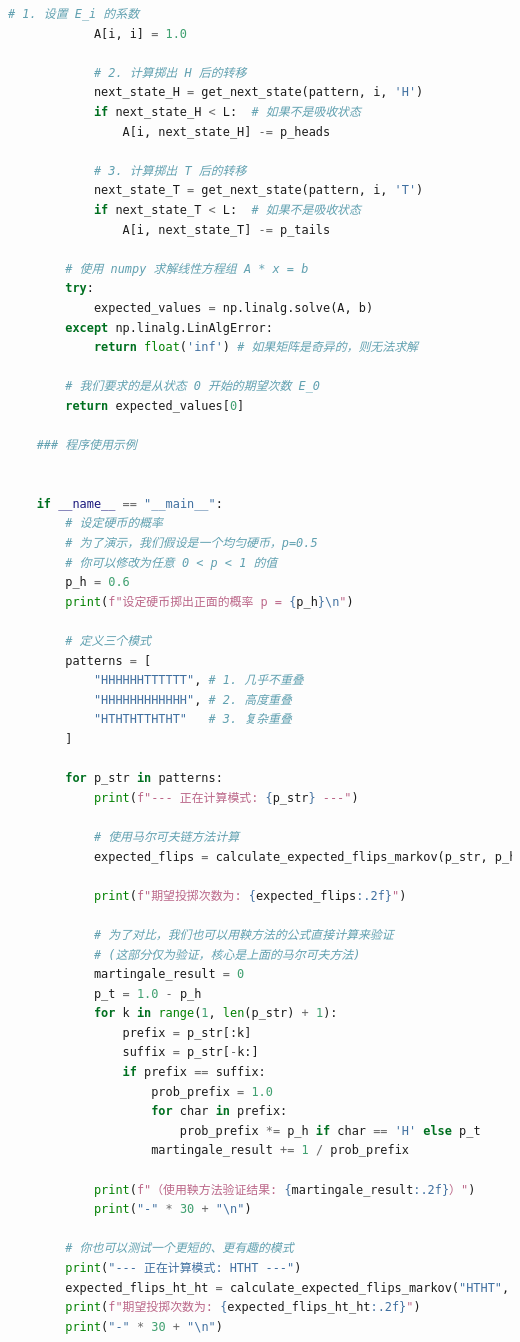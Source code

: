 \documentclass[UTF8]{ctexart}
\begin{document}
\begin{lstlisting}[language=Python, caption={求解期望投掷次数的函数核心逻辑}]
            # 1. 设置 E_i 的系数
            A[i, i] = 1.0
    
            # 2. 计算掷出 H 后的转移
            next_state_H = get_next_state(pattern, i, 'H')
            if next_state_H < L:  # 如果不是吸收状态
                A[i, next_state_H] -= p_heads
    
            # 3. 计算掷出 T 后的转移
            next_state_T = get_next_state(pattern, i, 'T')
            if next_state_T < L:  # 如果不是吸收状态
                A[i, next_state_T] -= p_tails
                
        # 使用 numpy 求解线性方程组 A * x = b
        try:
            expected_values = np.linalg.solve(A, b)
        except np.linalg.LinAlgError:
            return float('inf') # 如果矩阵是奇异的，则无法求解
    
        # 我们要求的是从状态 0 开始的期望次数 E_0
        return expected_values[0]
    
    ### 程序使用示例
    
    
    if __name__ == "__main__":
        # 设定硬币的概率
        # 为了演示，我们假设是一个均匀硬币，p=0.5
        # 你可以修改为任意 0 < p < 1 的值
        p_h = 0.6
        print(f"设定硬币掷出正面的概率 p = {p_h}\n")
    
        # 定义三个模式
        patterns = [
            "HHHHHHTTTTTT", # 1. 几乎不重叠
            "HHHHHHHHHHHH", # 2. 高度重叠
            "HTHTHTTHTHT"   # 3. 复杂重叠
        ]
    
        for p_str in patterns:
            print(f"--- 正在计算模式: {p_str} ---")
            
            # 使用马尔可夫链方法计算
            expected_flips = calculate_expected_flips_markov(p_str, p_h)
            
            print(f"期望投掷次数为: {expected_flips:.2f}")
            
            # 为了对比，我们也可以用鞅方法的公式直接计算来验证
            # (这部分仅为验证，核心是上面的马尔可夫方法)
            martingale_result = 0
            p_t = 1.0 - p_h
            for k in range(1, len(p_str) + 1):
                prefix = p_str[:k]
                suffix = p_str[-k:]
                if prefix == suffix:
                    prob_prefix = 1.0
                    for char in prefix:
                        prob_prefix *= p_h if char == 'H' else p_t
                    martingale_result += 1 / prob_prefix
            
            print(f"（使用鞅方法验证结果: {martingale_result:.2f}）")
            print("-" * 30 + "\n")
    
        # 你也可以测试一个更短的、更有趣的模式
        print("--- 正在计算模式: HTHT ---")
        expected_flips_ht_ht = calculate_expected_flips_markov("HTHT", 0.5)
        print(f"期望投掷次数为: {expected_flips_ht_ht:.2f}")
        print("-" * 30 + "\n")


\end{lstlisting}
\end{document}
